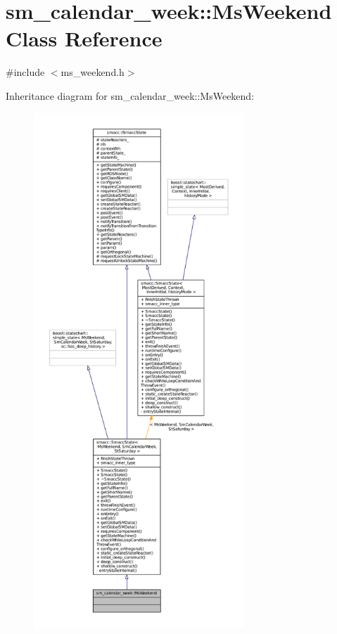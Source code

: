 \hypertarget{classsm__calendar__week_1_1MsWeekend}{}\section{sm\+\_\+calendar\+\_\+week\+:\+:Ms\+Weekend Class Reference}
\label{classsm__calendar__week_1_1MsWeekend}


{\ttfamily \#include $<$ms\+\_\+weekend.\+h$>$}



Inheritance diagram for sm\+\_\+calendar\+\_\+week\+:\+:Ms\+Weekend\+:
\nopagebreak
\begin{figure}[H]
\begin{center}
\leavevmode
\includegraphics[height=550pt]{classsm__calendar__week_1_1MsWeekend__inherit__graph}
\end{center}
\end{figure}


